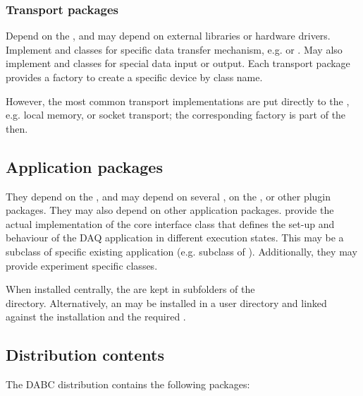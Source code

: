 \subsubsection{Transport packages}
   Depend on the , and may depend on external libraries or hardware drivers. 
   Implement  and 
    classes for specific data transfer mechanism, e.g. 
    or . May also implement  
   and  classes for special data input or output. Each transport package provides a 
   factory to create a specific device by class name. 
   
   However, the most common transport implementations are put 
   directly to the , e.g. local memory, or 
   socket transport; the corresponding factory is part of the  then. 
 
\subsection{Application packages}
They depend on the , and may depend 
on several , on the , or other plugin packages. 
They may also depend on other application packages. 
 provide the actual implementation of the core interface class
 that defines the set-up and behaviour of the DAQ application in 
different execution states. This may be a subclass of specific existing 
application (e.g. subclass of ). 
Additionally, they may provide experiment specific  classes.

When installed centrally, the  are kept in subfolders of the \\  
 directory. Alternatively, an  may be installed in a user directory and linked against the  installation and the required .


     
\subsection{Distribution contents}
The DABC distribution contains the following packages:

